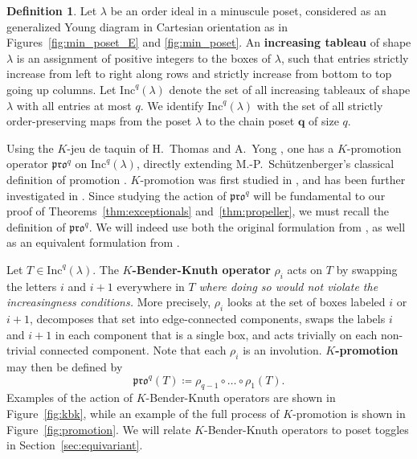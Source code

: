 \documentclass[12pt]{amsart}
\theoremstyle{definition}
\newtheorem{definition}[theorem]{Definition}
\theoremstyle{remark}
\numberwithin{equation}{section}
\newcommand{\inc}{\ensuremath{\mathrm{Inc}}}
\newcommand{\pro}{\mathfrak{pro}}
\begin{document}
\begin{definition}
Let $\lambda$ be an order ideal in a minuscule poset, considered as an generalized Young diagram in Cartesian orientation as in Figures~\ref{fig:min_poset_E} and \ref{fig:min_poset}. An {\bf increasing tableau} of shape $\lambda$ is an assignment of positive integers to the boxes of $\lambda$, such that entries strictly increase from left to right along rows and strictly increase from bottom to top going up columns. Let $\inc^q(\lambda)$ denote the set of all increasing tableaux of shape $\lambda$ with all entries at most $q$. We identify $\inc^q(\lambda)$ with the set of all strictly order-preserving maps from the poset $\lambda$ to the chain poset $\mathbf{q}$ of size $q$.
\end{definition}

Using the $K$-jeu de taquin of H.~Thomas and A.~Yong \cite{Thomas.Yong:K}, one has a $K$-promotion operator $\pro^q$ on $\inc^q(\lambda)$, directly extending M.-P.~Sch\"utzenberger's classical definition of promotion \cite{Schutzenberger:promotion}. $K$-promotion was first studied in \cite{Pechenik}, and has been further investigated in \cite{BPS, Pressey.Stokke.Visentin, Rhoades:skein, DPS, Pechenik:frames,Vorland}. Since studying the action of $\pro^q$ will be fundamental to our proof of Theorems~\ref{thm:exceptionals} and~\ref{thm:propeller}, we must recall the definition of $\pro^q$. 
We will indeed use both the original formulation from \cite{Pechenik}, as well as an equivalent formulation from \cite[Proposition~2.4]{DPS}.

Let $T \in \inc^q(\lambda)$. The {\bf $K$-Bender-Knuth operator} $\rho_i$ acts on $T$ by swapping the letters $i$ and $i+1$ everywhere in $T$ \emph{where doing so would not violate the increasingness conditions.} More precisely, $\rho_i$ looks at the set of boxes labeled $i$ or $i+1$, decomposes that set into edge-connected components, swaps the labels $i$ and $i+1$ in each component that is a single box, and acts trivially on each non-trivial connected component. 
Note that each $\rho_i$ is an involution.
{\bf $K$-promotion} may then be defined by
\[
\pro^q(T) \coloneqq \rho_{q-1} \circ \dots \circ \rho_1(T).
\]
Examples of the action of $K$-Bender-Knuth operators are shown in Figure~\ref{fig:kbk}, while an example of the full process of $K$-promotion is shown in Figure~\ref{fig:promotion}. We will relate $K$-Bender-Knuth operators to poset toggles in Section~\ref{sec:equivariant}.
\end{document}
